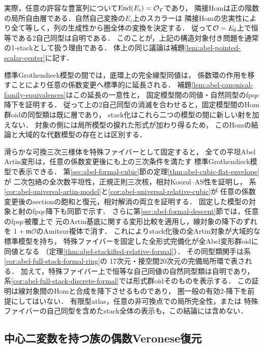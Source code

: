 実際，任意の許容な豊富列について$\operatorname{End}(E_i)=\mathcal O_T$であり，
隣接Homは正の階数の局所自由層である．自然自己変換の$E_i$上のスカラーは
隣接Homの忠実性により全て等しく，列の生成性から圏全体の変換を決定する．
従って$\mathcal O=E_0$上で恒等である2自己同型は自明である．
このことが，上記の構造対象付き問題を通常の1-stackとして扱う理由である．
体上の同じ議論は補題\ref{lem:abel-pointed-scalar-center}に記す．

標準Grothendieck模型の間では，底環上の完全線型同値は，
係数環の作用を移すことにより任意の係数変更へ標準的に延長される．
補題\ref{lem:abel-canonical-family-equivalences}はこの延長の一意性と，
固定模型間の同値・自然同型のfpqc降下を証明する．
従って上の2自己同型の消滅を合わせると，固定模型間のHom群oidの同型類は既に層であり，
stack化はこれら二つの模型の間に新しい射を加えない．
対象の側には局所模型の捩れた形式が加わり得るため，
このHomの結論と大域的な代数模型の存在とは区別する．

\begin{remark}[可換三次点での普遍的な相対模型]
\label{rem:abel-cubic-essential-image}
滑らかな可換三次三様体を特殊ファイバーとして固定すると，
全ての平坦Abel Artin変形は，任意の係数変更後にも上の三次条件を満たす
標準Grothendieck模型で表示できる．
第\ref{sec:abel-formal-cubic}節の定理\ref{thm:abel-cubic-flat-envelope}が
二次包絡の全次数平坦性，正規正則三次核，相対Koszul--AS性を証明し，
系\ref{cor:abel-universal-artin-model}と\ref{cor:abel-universal-relative-cubic}が
任意の係数変更後のsectionの飽和と復元，相対解消の両立を証明する．
固定した模型の対象と射のfpqc降下も同節で示す．
さらに第\ref{sec:abel-formal-descent}節では，任意のfpqc被覆上で
元のArtin基底に関する変形比較を適用し，線対象の降下のずれを
$1+\mathfrak m\mathcal O$のAmitsur複体で消す．
これによりstack化後の全Artin対象が大域的な標準模型を持ち，
特殊ファイバーを固定した全形式完備化が全Abel変形群oidに同値となる
（定理\ref{thm:abel-stackified-relative-formal}）．
その同型類関手は系\ref{cor:abel-full-stack-formal-ring}の
17次元・接空間20次元の完備局所環で表される．
加えて，特殊ファイバー上で恒等な自己同値の自然同型類は自明であり，
系\ref{cor:abel-full-stack-discrete-formal}では形式群oidそのものを表示する．
この証明は線対象間のHomと合成を降下させるものであり，
圏一般の有効$2$-降下を前提にしてはいない．
有限型atlas，任意の非可換点での局所完全性，または
特殊ファイバーの自己同型を含めたstack全体の表示も，この結論には含めない．
\end{remark}

\subsection{中心二変数を持つ族の偶数Veronese復元}
\label{subsec:abel-relative-veronese}

